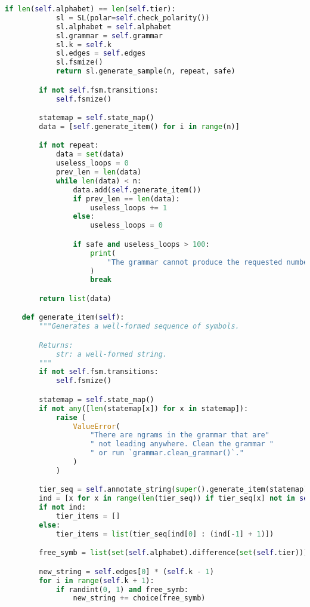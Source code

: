 \begin{lstlisting}[language=Python]
        if len(self.alphabet) == len(self.tier):
            sl = SL(polar=self.check_polarity())
            sl.alphabet = self.alphabet
            sl.grammar = self.grammar
            sl.k = self.k
            sl.edges = self.edges
            sl.fsmize()
            return sl.generate_sample(n, repeat, safe)

        if not self.fsm.transitions:
            self.fsmize()

        statemap = self.state_map()
        data = [self.generate_item() for i in range(n)]

        if not repeat:
            data = set(data)
            useless_loops = 0
            prev_len = len(data)
            while len(data) < n:
                data.add(self.generate_item())
                if prev_len == len(data):
                    useless_loops += 1
                else:
                    useless_loops = 0

                if safe and useless_loops > 100:
                    print(
                        "The grammar cannot produce the requested number" " of strings."
                    )
                    break

        return list(data)

    def generate_item(self):
        """Generates a well-formed sequence of symbols.

        Returns:
            str: a well-formed string.
        """
        if not self.fsm.transitions:
            self.fsmize()

        statemap = self.state_map()
        if not any([len(statemap[x]) for x in statemap]):
            raise (
                ValueError(
                    "There are ngrams in the grammar that are"
                    " not leading anywhere. Clean the grammar "
                    " or run `grammar.clean_grammar()`."
                )
            )

        tier_seq = self.annotate_string(super().generate_item(statemap))
        ind = [x for x in range(len(tier_seq)) if tier_seq[x] not in self.edges]
        if not ind:
            tier_items = []
        else:
            tier_items = list(tier_seq[ind[0] : (ind[-1] + 1)])

        free_symb = list(set(self.alphabet).difference(set(self.tier)))

        new_string = self.edges[0] * (self.k - 1)
        for i in range(self.k + 1):
            if randint(0, 1) and free_symb:
                new_string += choice(free_symb)


\end{lstlisting}
